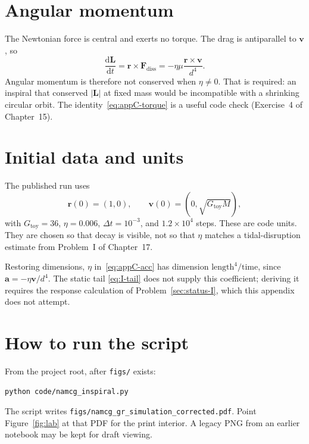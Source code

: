\section{Angular momentum}
\label{sec:appC-L}

The Newtonian force is central and exerts no torque. The drag is
antiparallel to \(\mathbf{v}\), so
\begin{equation}
  \label{eq:appC-torque}
  \frac{\mathrm{d}\mathbf{L}}{\mathrm{d}t}
  =\mathbf{r}\times\mathbf{F}_{\mathrm{diss}}
  =-\eta\mu\frac{\mathbf{r}\times\mathbf{v}}{d^{4}}.
\end{equation}
Angular momentum is therefore not conserved when \(\eta\neq 0\).
That is required: an inspiral that conserved \(|\mathbf{L}|\) at
fixed mass would be incompatible with a shrinking circular orbit.
The identity~\eqref{eq:appC-torque} is a useful code check
(Exercise~4 of Chapter~15).

\section{Initial data and units}
\label{sec:appC-ic}

The published run uses
\begin{equation}
  \label{eq:appC-ic}
  \mathbf{r}(0)=(1,0),\qquad
  \mathbf{v}(0)=(0,\sqrt{G_{\mathrm{toy}}M}),
\end{equation}
with \(G_{\mathrm{toy}}=36\), \(\eta=0.006\), \(\Delta t=10^{-3}\),
and \(1.2\times 10^{4}\) steps. These are code units. They are
chosen so that decay is visible, not so that \(\eta\) matches a
tidal-disruption estimate from Problem~I of Chapter~17.

Restoring dimensions, \(\eta\) in~\eqref{eq:appC-acc} has dimension
\(\mathrm{length}^{4}/\mathrm{time}\), since
\(\mathbf{a}=-\eta\mathbf{v}/d^{4}\). The static tail
\eqref{eq:I-tail} does not supply this coefficient; deriving it
requires the response calculation of Problem~\ref{sec:status-I},
which this appendix does not attempt.

\section{How to run the script}
\label{sec:appC-run}

From the project root, after \texttt{figs/} exists:
\begin{verbatim}
python code/namcg_inspiral.py
\end{verbatim}
The script writes
\texttt{figs/namcg\_gr\_simulation\_corrected.pdf}. Point
Figure~\ref{fig:lab} at that PDF for the print interior. A
legacy PNG from an earlier notebook may be kept for draft
viewing.

